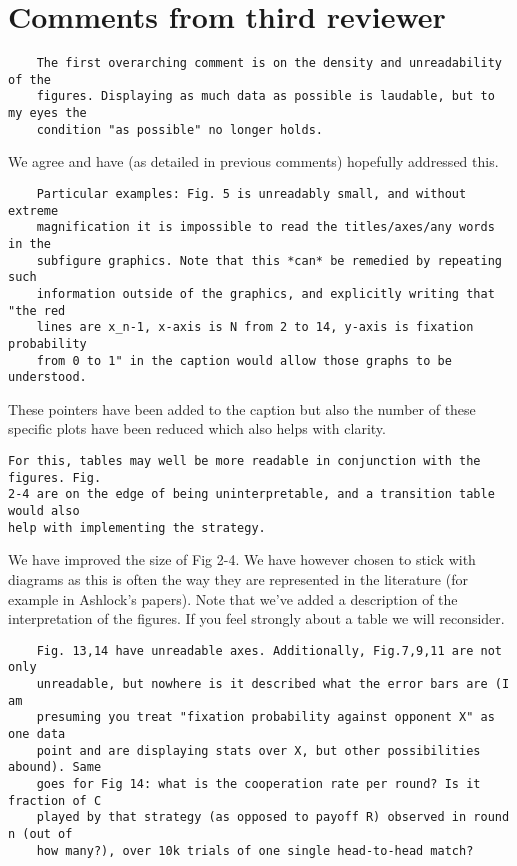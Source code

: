 \documentclass[a4]{article}
\begin{document}
\section{Comments from third reviewer}

\begin{verbatim}
    The first overarching comment is on the density and unreadability of the
    figures. Displaying as much data as possible is laudable, but to my eyes the
    condition "as possible" no longer holds.
\end{verbatim}

We agree and have (as detailed in previous comments) hopefully addressed this.

\begin{verbatim}
    Particular examples: Fig. 5 is unreadably small, and without extreme
    magnification it is impossible to read the titles/axes/any words in the
    subfigure graphics. Note that this *can* be remedied by repeating such
    information outside of the graphics, and explicitly writing that "the red
    lines are x_n-1, x-axis is N from 2 to 14, y-axis is fixation probability
    from 0 to 1" in the caption would allow those graphs to be understood.
\end{verbatim}

These pointers have been added to the caption but also the number of these
specific plots have been reduced which also helps with clarity.

\begin{verbatim}
For this, tables may well be more readable in conjunction with the figures. Fig.
2-4 are on the edge of being uninterpretable, and a transition table would also
help with implementing the strategy.
\end{verbatim}

We have improved the size of Fig 2-4. We have however chosen to stick with
diagrams as this is often the way they are represented in the literature (for
example in Ashlock's papers). Note that we've added a description of the
interpretation of the figures. If you feel strongly about a table we will
reconsider.

\begin{verbatim}
    Fig. 13,14 have unreadable axes. Additionally, Fig.7,9,11 are not only
    unreadable, but nowhere is it described what the error bars are (I am
    presuming you treat "fixation probability against opponent X" as one data
    point and are displaying stats over X, but other possibilities abound). Same
    goes for Fig 14: what is the cooperation rate per round? Is it fraction of C
    played by that strategy (as opposed to payoff R) observed in round n (out of
    how many?), over 10k trials of one single head-to-head match?
\end{verbatim}
\end{document}
